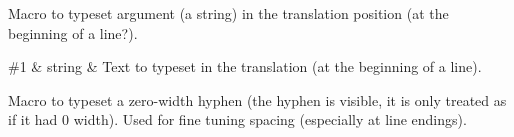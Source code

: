 Macro to typeset argument (a string) in the translation position (at
the beginning of a line?).

\begin{argtable}
  \#1 & string & Text to typeset in the translation (at the beginning of a line).\\
\end{argtable}

Macro to typeset a zero-width hyphen (the hyphen is visible, it is only
treated as if it had 0 width).  Used for fine tuning spacing
(especially at line endings).

